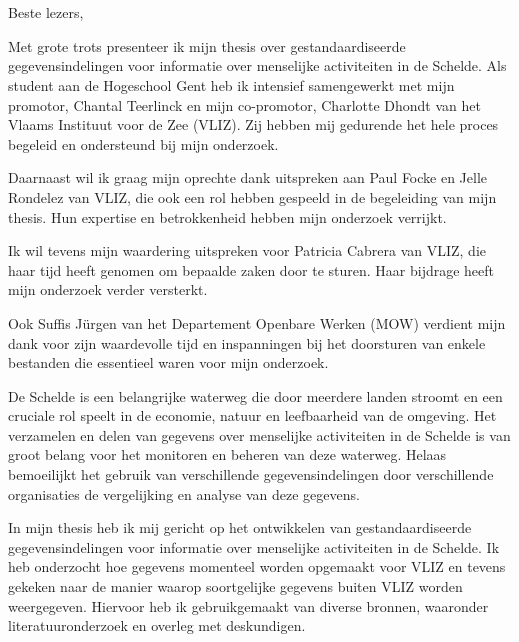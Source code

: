 
\chapter*{}%
\label{ch:voorwoord}


Beste lezers,

Met grote trots presenteer ik mijn thesis over gestandaardiseerde gegevensindelingen voor informatie over menselijke activiteiten in de Schelde. Als student aan de Hogeschool Gent heb ik intensief samengewerkt met mijn promotor, Chantal Teerlinck en mijn co-promotor, Charlotte Dhondt van het Vlaams Instituut voor de Zee (VLIZ). Zij hebben mij gedurende het hele proces begeleid en ondersteund bij mijn onderzoek.

Daarnaast wil ik graag mijn oprechte dank uitspreken aan Paul Focke en Jelle Rondelez van VLIZ, die ook een rol hebben gespeeld in de begeleiding van mijn thesis. Hun expertise en betrokkenheid hebben mijn onderzoek verrijkt.

Ik wil tevens mijn waardering uitspreken voor Patricia Cabrera van VLIZ, die haar tijd heeft genomen om bepaalde zaken door te sturen. Haar bijdrage heeft mijn onderzoek verder versterkt.

Ook Suffis Jürgen van het Departement Openbare Werken (MOW) verdient mijn dank voor zijn waardevolle tijd en inspanningen bij het doorsturen van enkele bestanden die essentieel waren voor mijn onderzoek.

De Schelde is een belangrijke waterweg die door meerdere landen stroomt en een cruciale rol speelt in de economie, natuur en leefbaarheid van de omgeving. Het verzamelen en delen van gegevens over menselijke activiteiten in de Schelde is van groot belang voor het monitoren en beheren van deze waterweg. Helaas bemoeilijkt het gebruik van verschillende gegevensindelingen door verschillende organisaties de vergelijking en analyse van deze gegevens.

In mijn thesis heb ik mij gericht op het ontwikkelen van gestandaardiseerde gegevensindelingen voor informatie over menselijke activiteiten in de Schelde. Ik heb onderzocht hoe gegevens momenteel worden opgemaakt voor VLIZ en tevens gekeken naar de manier waarop soortgelijke gegevens buiten VLIZ worden weergegeven. Hiervoor heb ik gebruikgemaakt van diverse bronnen, waaronder literatuuronderzoek en overleg met deskundigen.

